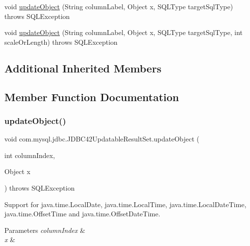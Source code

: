\begin{DoxyCompactItemize}
\item 
void \mbox{\hyperlink{classcom_1_1mysql_1_1jdbc_1_1_j_d_b_c42_updatable_result_set_a5b03ebab6e0f49e7fefde6d2ae9cdab8}{update\+Object}} (String column\+Label, Object x, S\+Q\+L\+Type target\+Sql\+Type)  throws S\+Q\+L\+Exception 
\item 
void \mbox{\hyperlink{classcom_1_1mysql_1_1jdbc_1_1_j_d_b_c42_updatable_result_set_acf89b11afe1cfdb0d1cbf9f0699ab217}{update\+Object}} (String column\+Label, Object x, S\+Q\+L\+Type target\+Sql\+Type, int scale\+Or\+Length)  throws S\+Q\+L\+Exception 
\end{DoxyCompactItemize}
\subsection*{Additional Inherited Members}


\subsection{Member Function Documentation}
\mbox{\label{classcom_1_1mysql_1_1jdbc_1_1_j_d_b_c42_updatable_result_set_a07c5b44cf69187e3a9aadf5300b91db4}} 
\subsubsection{\texorpdfstring{update\+Object()}{updateObject()}\hspace{0.1cm}{\footnotesize\ttfamily [1/8]}}
{\footnotesize\ttfamily void com.\+mysql.\+jdbc.\+J\+D\+B\+C42\+Updatable\+Result\+Set.\+update\+Object (\begin{DoxyParamCaption}\item[{int}]{column\+Index,  }\item[{Object}]{x }\end{DoxyParamCaption}) throws S\+Q\+L\+Exception}

Support for java.\+time.\+Local\+Date, java.\+time.\+Local\+Time, java.\+time.\+Local\+Date\+Time, java.\+time.\+Offset\+Time and java.\+time.\+Offset\+Date\+Time.


\begin{DoxyParams}{Parameters}
{\em column\+Index} & \\
\hline
{\em x} & \\
\hline
\end{DoxyParams}

